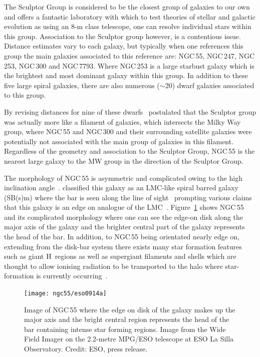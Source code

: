 The Sculptor Group is considered to be the closest group of galaxies to our own and offers a fantastic laboratory with which to test theories of stellar and galactic evolution as using an 8-m class telescope, one can resolve individual stars within this group.
Association to the Sculptor group however, is a contentious issue.
Distance estimates vary to each galaxy, but typically when one references this group the main galaxies associated to this reference are: NGC\,55, NGC\,247, NGC\,253, NGC\,300 and NGC\,7793.
Where NGC\,253 is a large starbust galaxy which is the brightest and most dominant galaxy within this group.
In addition to these five large spiral galaxies, there are also numerous ($\sim$20) dwarf galaxies associated to this group.

By revising distances for nine of these dwarfs~\cite{2003A&A...404...93K} postulated that the Sculptor group was actually more like a filament of galaxies, which intersects the Milky Way group, where NGC\,55 and NGC\,300 and their surrounding satellite galaxies were potentially not associated with the main group of galaxies in this filament.
Regardless of the geometry and association to the Sculptor Group, NGC\,55 is the nearest large galaxy to the MW group in the direction of the Sculptor Group.

The morphology of NGC\,55 is asymmetric and complicated owing to the high inclination angle~\cite[up to 80\textdegree;][]{1986A&A...166...97H,2013MNRAS.434.3511W}.
\cite{1961ApJ...133..405D} classified this galaxy as an LMC-like spiral barred galaxy (SB(s)m) where the bar is seen along the line of sight~\cite{1961ApJ...133..405D}
prompting various claims that this galaxy is an edge on analogue of the LMC~\citep[e.g.][although not cited heavily -- two citations in 50 years -- the idea has propagated]{1964IAUS...20..276R}.
Figure~\ref{fig:ngc55-wide} shows NGC\,55 and its complicated morphology where one can see the edge-on disk along the major axis of the galaxy and the brighter central part of the galaxy represents the head of the bar.
In addition, to NGC\,55 being orientated nearly edge on, extending from the disk-bar system there exists many star formation features such as giant H\,\2 regions as well as supergiant filaments and shells which are thought to allow ionising radiation to be transported to the halo where star-formation is currently occurring~\citep{1996AJ....112.2567F}.

\begin{figure}
 \centering
 \texttt{[image: ngc55/eso0914a]}
 \caption[Image of NGC\,55]{Image of NGC\,55 where the edge on disk of the galaxy makes up the major axis and the bright central region represents the head of the bar containing intense star forming regions.
 Image from the Wide Field Imager on the 2.2-metre MPG/ESO telescope at ESO La Silla Observatory. Credit: ESO, press release.}
 \label{fig:ngc55-wide}
\end{figure}


